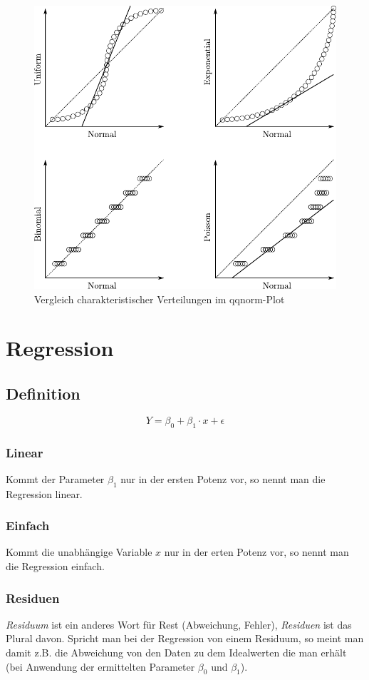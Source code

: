 \begin{figure}[h!]
        \centering
        \includegraphics[scale=\graphscale]{qqnorm-kurven.pdf}
        \caption{Vergleich charakteristischer Verteilungen im qqnorm-Plot}
\end{figure}

\section{Regression}

\subsection{Definition}
\[ Y = \beta_0 + \beta_1 \cdot x + \epsilon \]

\subsubsection{Linear}
Kommt der Parameter $\beta_1$ nur in der ersten Potenz vor, so nennt man die
Regression linear.

\subsubsection{Einfach}
Kommt die unabhängige Variable $x$ nur in der erten Potenz vor, so nennt man 
die Regression einfach.

\subsubsection{Residuen}
\emph{Residuum} ist ein anderes Wort für Rest (Abweichung, Fehler),
\emph{Residuen} ist das Plural davon.
Spricht man bei der Regression von einem Residuum, so meint man damit z.B.
die Abweichung von den Daten zu dem Idealwerten die man erhält (bei Anwendung
der ermittelten Parameter $\beta_0$ und $\beta_1$).

